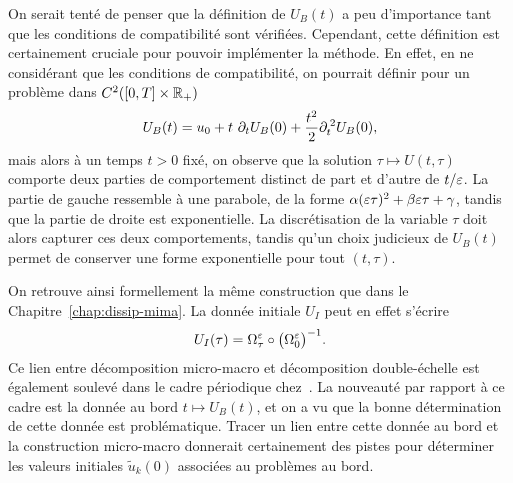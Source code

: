 \begin{FRremark}
    On serait tenté de penser que la définition de $U_B(t)$ a peu d'importance tant que les conditions de compatibilité sont vérifiées. Cependant, cette définition est certainement cruciale pour pouvoir implémenter la méthode. En effet, en ne considérant que les conditions de compatibilité, on pourrait définir pour un problème dans $C^2([0,T] \times \mathbb{R}_+)$
    \begin{equation*}
        U_B(t) = u_0 + t\ \partial_t U_B(0) 
            + \frac{t^2}{2} \partial_t ^{\:2} U_B(0) ,
    \end{equation*}
    mais alors à un temps $t > 0$ fixé, on observe que la solution $\tau \mapsto U(t,\tau)$ comporte deux parties de comportement distinct de part et d'autre de $t/\varepsilon$. La partie de gauche ressemble à une parabole, de la forme $\alpha (\varepsilon\tau)^2 + \beta\varepsilon\tau + \gamma$, tandis que la partie de droite est exponentielle. La discrétisation de la variable $\tau$ doit alors capturer ces deux comportements, tandis qu'un choix judicieux de $U_B(t)$ permet de conserver une forme exponentielle pour tout $(t,\tau)$. 
\end{FRremark}

On retrouve ainsi formellement la même construction que dans le Chapitre~\ref{chap:dissip-mima}. La donnée initiale $U_I$ peut en effet s'écrire 
\begin{equation*}
    U_I(\tau) = \Omega^{\varepsilon}_\tau \circ \big( \Omega^{\varepsilon} _0 \big)^{-1} .
\end{equation*}
Ce lien entre décomposition micro-macro et décomposition double-échelle est également soulevé dans le cadre périodique chez~\cite{chartier.2020.derivative}. La nouveauté par rapport à ce cadre est la donnée au bord $t \mapsto U_B(t)$, et on a vu que la bonne détermination de cette donnée est problématique. Tracer un lien entre cette donnée au bord et la construction micro-macro donnerait certainement des pistes pour déterminer les valeurs initiales $\widetilde{u}_k(0)$ associées au problèmes au bord. 